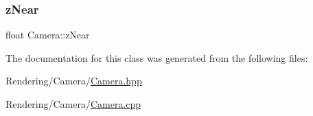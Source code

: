 \mbox{\label{classCamera_a1db2166635ff27594eda3a23130b66ac}} 
\subsubsection{\texorpdfstring{z\+Near}{zNear}}
{\footnotesize\ttfamily float Camera\+::z\+Near\hspace{0.3cm}{\ttfamily [private]}}



The documentation for this class was generated from the following files\+:\begin{DoxyCompactItemize}
\item 
Rendering/\+Camera/\mbox{\hyperlink{Camera_8hpp}{Camera.\+hpp}}\item 
Rendering/\+Camera/\mbox{\hyperlink{Camera_8cpp}{Camera.\+cpp}}\end{DoxyCompactItemize}
